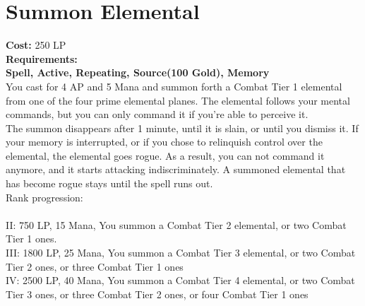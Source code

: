 \section{Summon Elemental}\label{spell:summonElemental}
\textbf{Cost:} 250 LP\\
\textbf{Requirements:} \\
\textbf{Spell, Active, Repeating, Source(100 Gold), Memory}\\
You cast for 4 AP and 5 Mana and summon forth a Combat Tier 1 elemental from one of the four prime elemental planes.
The elemental follows your mental commands, but you can only command it if you're able to perceive it.\\
The summon disappears after 1 minute, until it is slain, or until you dismiss it.
If your memory is interrupted, or if you chose to relinquish control over the elemental, the elemental goes rogue.
As a result, you can not command it anymore, and it starts attacking indiscriminately.
A summoned elemental that has become rogue stays until the spell runs out.
\\
Rank progression:\\
\\
II: 750 LP, 15 Mana, You summon a Combat Tier 2 elemental, or two Combat Tier 1 ones.\\
III: 1800 LP, 25 Mana, You summon a Combat Tier 3 elemental, or two Combat Tier 2 ones, or three Combat Tier 1 ones\\
IV: 2500 LP, 40 Mana, You summon a Combat Tier 4 elemental, or two Combat Tier 3 ones, or three Combat Tier 2 ones, or four Combat Tier 1 ones\\
